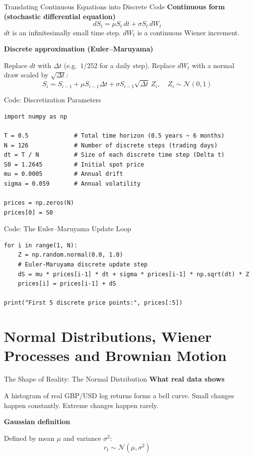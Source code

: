 \documentclass[aspectratio=169,11pt]{beamer}
\begin{document}
\begin{frame}{Translating Continuous Equations into Discrete Code}
  \textbf{Continuous form (stochastic differential equation)}
  \[
    dS_t = \mu S_t\, dt + \sigma S_t\, dW_t
  \]
  {\small $dt$ is an infinitesimally small time step. $dW_t$ is a continuous Wiener increment.}
  \bigskip

  \textbf{Discrete approximation (Euler--Maruyama)}

  {\small Replace $dt$ with $\Delta t$ (e.g.\ $1/252$ for a daily step). Replace $dW_t$ with a normal draw scaled by $\sqrt{\Delta t}$:}
  \[
    S_{i} = S_{i-1} + \mu S_{i-1} \Delta t + \sigma S_{i-1} \sqrt{\Delta t}\, Z_i, \quad Z_i \sim \mathcal{N}(0, 1)
  \]
\end{frame}

\begin{frame}[fragile]{Code: Discretization Parameters}
\begin{lstlisting}
import numpy as np

T = 0.5             # Total time horizon (0.5 years ~ 6 months)
N = 126             # Number of discrete steps (trading days)
dt = T / N          # Size of each discrete time step (Delta t)
S0 = 1.2645         # Initial spot price
mu = 0.0005         # Annual drift
sigma = 0.059       # Annual volatility

prices = np.zeros(N)
prices[0] = S0
\end{lstlisting}
\end{frame}

\begin{frame}[fragile]{Code: The Euler--Maruyama Update Loop}
\begin{lstlisting}
for i in range(1, N):
    Z = np.random.normal(0.0, 1.0)
    # Euler-Maruyama discrete update step
    dS = mu * prices[i-1] * dt + sigma * prices[i-1] * np.sqrt(dt) * Z
    prices[i] = prices[i-1] + dS

print("First 5 discrete price points:", prices[:5])
\end{lstlisting}
\end{frame}

\section{Normal Distributions, Wiener Processes and Brownian Motion}

\begin{frame}{The Shape of Reality: The Normal Distribution}
  \textbf{What real data shows}

  A histogram of real GBP/USD log returns forms a bell curve. Small changes happen constantly. Extreme changes happen rarely.
  \bigskip

  \textbf{Gaussian definition}

  Defined by mean $\mu$ and variance $\sigma^2$:
  \[
    r_t \sim \mathcal{N}(\mu, \sigma^2)
  \]
\end{frame}
\end{document}
